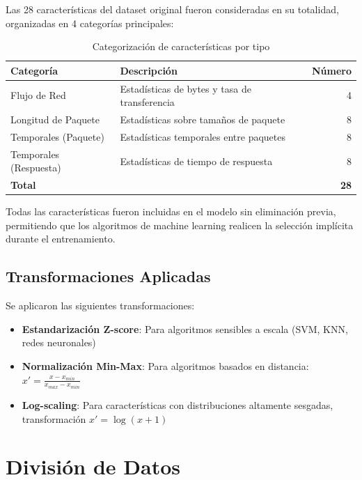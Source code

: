 Las 28 características del dataset original fueron consideradas en su totalidad, organizadas en 4 categorías principales:

\begin{table}[H]
    \centering
    \caption{Categorización de características por tipo}
    \label{tab:feature_categories}
    \begin{tabular}{|l|l|r|}
        \hline
        \textbf{Categoría} & \textbf{Descripción} & \textbf{Número} \\
        \hline
        Flujo de Red & Estadísticas de bytes y tasa de transferencia & 4 \\
        Longitud de Paquete & Estadísticas sobre tamaños de paquete & 8 \\
        Temporales (Paquete) & Estadísticas temporales entre paquetes & 8 \\
        Temporales (Respuesta) & Estadísticas de tiempo de respuesta & 8 \\
        \hline
        \textbf{Total} & & \textbf{28} \\
        \hline
    \end{tabular}
\end{table}

Todas las características fueron incluidas en el modelo sin eliminación previa, permitiendo que los algoritmos de machine learning realicen la selección implícita durante el entrenamiento.

\subsection{Transformaciones Aplicadas}

Se aplicaron las siguientes transformaciones:

\begin{itemize}
    \item \textbf{Estandarización Z-score}: Para algoritmos sensibles a escala (SVM, KNN, redes neuronales)
    \item \textbf{Normalización Min-Max}: Para algoritmos basados en distancia: $x' = \frac{x - x_{min}}{x_{max} - x_{min}}$
    \item \textbf{Log-scaling}: Para características con distribuciones altamente sesgadas, transformación $x' = \log(x + 1)$
\end{itemize}

\section{División de Datos}\label{sec:division_datos}

